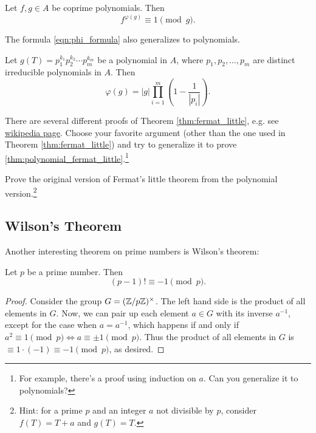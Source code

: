 \begin{theorem}
    \label{thm:polynomial_euler}
    Let $f, g \in A$ be coprime polynomials.
    Then
    \[
        f^{\varphi(g)} \equiv 1 \pmod{g}.
    \]
\end{theorem}

The formula \eqref{eqn:phi_formula} also generalizes to polynomials.
\begin{theorem}
    \label{thm:polynomial_phi_prime_power}
    Let $g(T) = p_1^{k_1} p_2^{k_2} \cdots p_m^{k_m}$ be a polynomial in $A$, where $p_1, p_2, \ldots, p_m$ are distinct irreducible polynomials in $A$.
    Then
    \[
        \varphi(g) = |g| \prod_{i=1}^m \left(1 - \frac{1}{|p_i|}\right).
    \]
\end{theorem}

\begin{exercise}
    There are several different proofs of Theorem \ref{thm:fermat_little}, e.g. see \href{https://en.wikipedia.org/wiki/Proofs_of_Fermat%27s_little_theorem}{wikipedia page}.
    Choose your favorite argument (other than the one used in Theorem \ref{thm:fermat_little}) and try to generalize it to prove \ref{thm:polynomial_fermat_little}.\footnote{For example, there's a proof using induction on $a$. Can you generalize it to polynomials?}
\end{exercise}

\begin{exercise}
    Prove the original version of Fermat's little theorem from the polynomial version.\footnote{Hint: for a prime $p$ and an integer $a$ not divisible by $p$, consider $f(T) = T + a$ and $g(T) = T$.}
\end{exercise}



\subsection{Wilson's Theorem}
\label{subsec:basicnt_wilson}

Another interesting theorem on prime numbers is Wilson's theorem:
\begin{theorem}
    Let $p$ be a prime number. Then
    \[
        (p - 1)! \equiv -1 \pmod{p}.
    \]
\end{theorem}
\begin{proof}
    Consider the group $G = (\mathbb{Z} / p\mathbb{Z})^\times$.
    The left hand side is the product of all elements in $G$.
    Now, we can pair up each element $a \in G$ with its inverse $a^{-1}$, except for the case when $a = a^{-1}$, which happens if and only if $a^2 \equiv 1 \pmod{p} \Leftrightarrow a \equiv \pm 1 \pmod{p}$.
    Thus the product of all elements in $G$ is $\equiv 1 \cdot (-1) \equiv -1 \pmod{p}$, as desired.
\end{proof}

